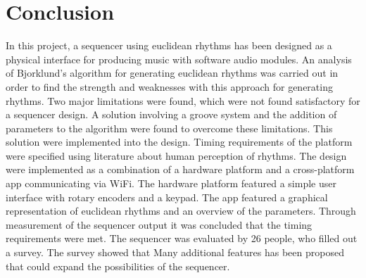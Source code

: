 \chapter{Conclusion}








In this project, a sequencer using euclidean rhythms has been designed as a physical interface for producing music with software audio modules. An analysis of Bjorklund's algorithm for generating euclidean rhythms was carried out in order to find the strength and weaknesses with this approach for generating rhythms. Two major limitations were found, which were not found satisfactory for a sequencer design. A solution  involving a groove system and the addition of parameters to the algorithm were found to overcome these limitations. This solution were implemented into the design. Timing requirements of the platform were specified using literature about human perception of rhythms. The design were implemented as a combination of a hardware platform and a cross-platform app communicating via WiFi. The hardware platform featured a simple user interface with rotary encoders and a keypad. The app featured a graphical representation of euclidean rhythms and an overview of the parameters. Through measurement of the sequencer output it was concluded that the timing requirements were met. The sequencer was evaluated by 26 people, who filled out a survey. The survey showed that 
Many additional features has been proposed that could expand the possibilities of the sequencer. 

